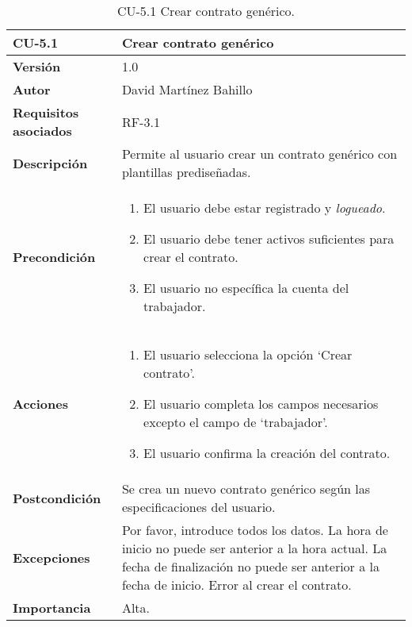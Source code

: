 \begin{table}[p]
	\centering
	\begin{tabularx}{\linewidth}{ p{} p{} }
		\toprule
		\textbf{CU-5.1}  & \textbf{Crear contrato genérico}\\
		\midrule
		\textbf{Versión}              & 1.0    \\
		\textbf{Autor}                & David Martínez Bahillo \\
		\textbf{Requisitos asociados} & RF-3.1 \\
		\textbf{Descripción}          & Permite al usuario crear un contrato genérico con plantillas prediseñadas. \\
		\textbf{Precondición}         &  
		\begin{enumerate}
			\def\labelenumi{\arabic{enumi}.}
			\tightlist
			\item El usuario debe estar registrado y \textit{logueado}.
			\item El usuario debe tener activos suficientes para crear el contrato.
			\item El usuario no específica la cuenta del trabajador.
		\end{enumerate}\\
		\textbf{Acciones}             &
		\begin{enumerate}
			\def\labelenumi{\arabic{enumi}.}
			\tightlist
			\item El usuario selecciona la opción `Crear contrato'.
			\item El usuario completa los campos necesarios excepto el campo de `trabajador'.
			\item El usuario confirma la creación del contrato.
		\end{enumerate}\\
		\textbf{Postcondición}        & Se crea un nuevo contrato genérico según las especificaciones del usuario. \\
			\textbf{Excepciones}      & Por favor, introduce todos los datos. La hora de inicio no puede 
			ser anterior a la hora actual. La fecha de finalización no puede ser anterior a la fecha de
			inicio. Error al crear el contrato.  \\
		\textbf{Importancia}          & Alta.  \\
		\bottomrule
	\end{tabularx}
	\caption{CU-5.1 Crear contrato genérico.}
\end{table}


